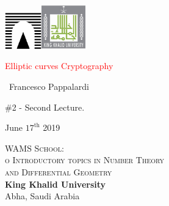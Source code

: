 \documentclass[handout]{beamer}%
\title[Elliptic curves over $\F_{q}$]{\insertlecture}
\theoremstyle{definition}
\begin{document}
\begin{frame}
\includegraphics[width=1.6cm]{images/roma3.pdf}\hfill\includegraphics[width=1.9cm]{images/kku.jpeg}
\vfill

\begin{center}\begin{sc}
\begin{Large}

\textcolor{red}{Elliptic curves Cryptography}
\end{Large}\bigskip

\ {Francesco Pappalardi}\bigskip\bigskip

\begin{large}\begin{bf}\#2 - Second Lecture.
\end{bf}\end{large}\medskip

June $17^{\text{th}}$ 2019\medskip
\vfill
\end{sc}\end{center}

\begin{minipage}[b]{9.3cm}
\textsc{WAMS School:\\o
Introductory topics in Number Theory\\ and Differential Geometry}\\
\textbf{King Khalid University}\\
Abha, Saudi Arabia
\end{minipage}\hfill
\end{frame}
\end{document}

